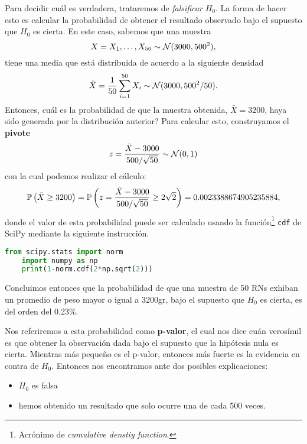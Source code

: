 Para decidir cuál es verdadera, trataremos de \emph{falsificar} $H_0$. La forma de hacer esto es calcular la probabilidad de obtener el resultado observado bajo el supuesto que $H_0$ es cierta. En este caso, sabemos que una muestra 
\begin{equation}
	X = X_1,\ldots,X_{50}\sim{\mathcal N}(3000,500^2),
\end{equation}
tiene una media que está distribuida de acuerdo a la siguiente densidad 
\begin{equation}
	\bar{X} = \frac{1}{50} \sum_{i=1}^{50} X_i \sim {\mathcal N}(3000,500^2/50).
\end{equation}
Entonces, cuál es la probabilidad de que la muestra obtenida, $\bar{X}=3200$, haya sido generada por la distribución anterior? Para calcular esto, construyamos el \textbf{pivote} 
\begin{equation}
	z = \frac{\bar{X}-3000}{500/\sqrt{50}}\sim{\mathcal N}(0,1)
\end{equation}
con la cual podemos realizar el cálculo:
\begin{equation}
	\mathbb{P} \left(\bar{X}\geq 3200\right) = \mathbb{P} \left(z = \frac{\bar{X}-3000}{500/\sqrt{50}}\geq 2\sqrt{2}\right) = 0.0023388674905235884,
\end{equation}
donde el valor de esta probabilidad puede ser calculado usando la función\footnote{Acrónimo de \textit{cumulative denstiy function}.} \texttt{cdf} de SciPy mediante la siguiente instrucción. 
\begin{lstlisting}[language=Python]
	from scipy.stats import norm
	import numpy as np
	print(1-norm.cdf(2*np.sqrt(2)))
\end{lstlisting}
Concluimos entonces que la probabilidad de que una muestra de 50 RNs exhiban un promedio de peso mayor o igual a 3200gr, bajo el supuesto que $H_0$ es cierta, es del orden del 0.23\%. 

Nos referiremos a esta probabilidad como \textbf{p-valor}, el cual nos dice cuán verosímil es que obtener la observación dada bajo el supuesto que la hipótesis nula es cierta. Mientras más pequeño es el p-valor, entonces más fuerte es la evidencia en contra de $H_0$. Entonces nos encontramos ante dos posibles explicaciones: 
\begin{itemize}
 	\item $H_0$ es falsa
 	\item hemos obtenido un resultado que solo ocurre una de cada 500 veces. 
 \end{itemize} 


